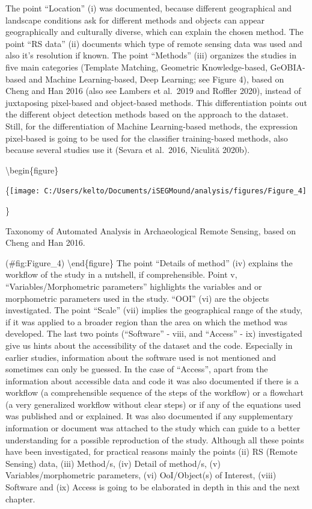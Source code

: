 \documentclass[
]{article}
\begin{document}
The point ``Location'' (i) was documented, because different geographical and landscape conditions ask for different methods and objects can appear geographically and culturally diverse, which can explain the chosen method. The point ``RS data'' (ii) documents which type of remote sensing data was used and also it's resolution if known. The point ``Methods'' (iii) organizes the studies in five main categories (Template Matching, Geometric Knowledge-based, GeOBIA-based and Machine Learning-based, Deep Learning; see Figure 4), based on Cheng and Han 2016 (also see Lambers et al.~2019 and Roffler 2020), instead of juxtaposing pixel-based and object-based methods. This differentiation points out the different object detection methods based on the approach to the dataset. Still, for the differentiation of Machine Learning-based methods, the expression pixel-based is going to be used for the classifier training-based methods, also because several studies use it (Sevara et al.~2016, Niculită 2020b).

\textbackslash begin\{figure\}

\{\centering \texttt{[image: C:/Users/kelto/Documents/iSEGMound/analysis/figures/Figure\_4]}

\}

\caption{Taxonomy of Automated Analysis in Archaeological Remote Sensing, based on Cheng and Han 2016.}

(\#fig:Figure\_4)
\textbackslash end\{figure\}
The point ``Details of method'' (iv) explains the workflow of the study in a nutshell, if comprehensible. Point v, ``Variables/Morphometric parameters'' highlights the variables and or morphometric parameters used in the study. ``OOI'' (vi) are the objects investigated. The point ``Scale'' (vii) implies the geographical range of the study, if it was applied to a broader region than the area on which the method was developed. The last two points (``Software'' - viii, and ``Access'' - ix) investigated give us hints about the accessibility of the dataset and the code. Especially in earlier studies, information about the software used is not mentioned and sometimes can only be guessed. In the case of ``Access'', apart from the information about accessible data and code it was also documented if there is a workflow (a comprehensible sequence of the steps of the workflow) or a flowchart (a very generalized workflow without clear steps) or if any of the equations used was published and or explained. It was also documented if any supplementary information or document was attached to the study which can guide to a better understanding for a possible reproduction of the study. Although all these points have been investigated, for practical reasons mainly the points (ii) RS (Remote Sensing) data, (iii) Method/s, (iv) Detail of method/s, (v) Variables/morphometric parameters, (vi) OoI/Object(s) of Interest, (viii) Software and (ix) Access is going to be elaborated in depth in this and the next chapter.
\end{document}
